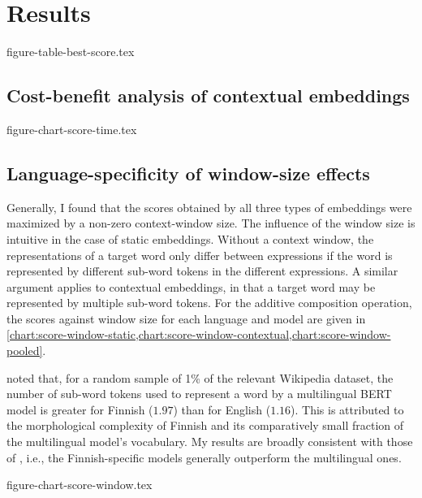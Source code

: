 \section{Results}
\label{sec:results}

{figure-table-best-score.tex}

\subsection{Cost-benefit analysis of contextual embeddings}
\label{sec:cost-benefit}

{figure-chart-score-time.tex}


\subsection{Language-specificity of window-size effects}

Generally, I found that the scores obtained by all three types of embeddings were
maximized by a non-zero context-window size.
The influence of the window size is intuitive in the case of static embeddings.
Without a context window, the representations of a target word only differ between
expressions if the word is represented by different sub-word tokens in the different
expressions.
A similar argument applies to contextual embeddings, in that a target word may be
represented by multiple sub-word tokens.
For the additive composition operation, the scores against window size for each
language and model are given in
\cref{chart:score-window-static,chart:score-window-contextual,chart:score-window-pooled}.

\textcite[3]{Virtanen2019} noted that, for a random sample of 1\% of the relevant
Wikipedia dataset, the number of sub-word tokens used to represent a word by a
multilingual BERT model is greater for Finnish ($1.97$) than for English ($1.16$).
This is attributed to the morphological complexity of Finnish and its comparatively
small fraction of the multilingual model's vocabulary.
My results are broadly consistent with those of \citeauthor{Virtanen2019}, i.e., the
Finnish-specific models generally outperform the multilingual ones.

{figure-chart-score-window.tex}
